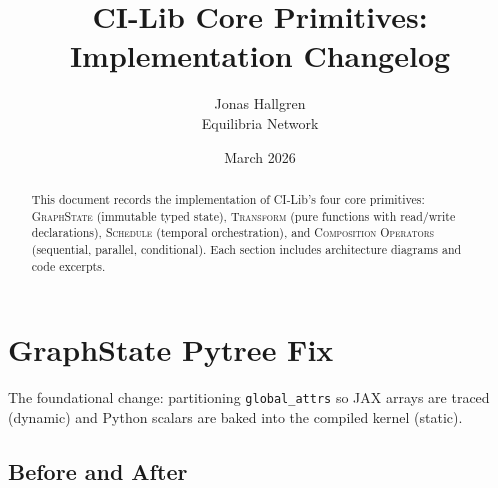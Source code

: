 \documentclass[11pt]{article}
\title{CI-Lib Core Primitives:\\Implementation Changelog}
\author{Jonas Hallgren\\Equilibria Network}
\date{March 2026}
\begin{document}
\maketitle

\begin{abstract}
This document records the implementation of CI-Lib's four core primitives:
\textsc{GraphState} (immutable typed state), \textsc{Transform} (pure functions with read/write declarations),
\textsc{Schedule} (temporal orchestration), and \textsc{Composition Operators}
(sequential, parallel, conditional). Each section includes architecture diagrams
and code excerpts.
\end{abstract}

\tableofcontents
\newpage

\section{GraphState Pytree Fix}

The foundational change: partitioning \texttt{global\_attrs} so JAX arrays
are traced (dynamic) and Python scalars are baked into the compiled kernel (static).

\subsection{Before and After}
\end{document}
